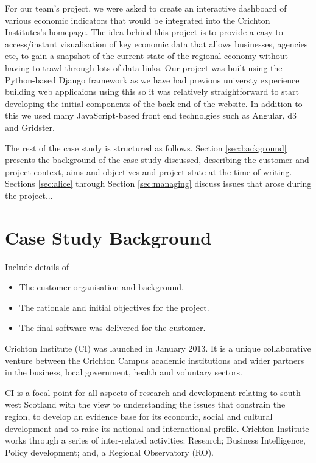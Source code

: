 \documentclass{l3proj}
\begin{document}
For our team's project, we were asked to create an interactive dashboard of various economic indicators that would be
integrated into the Crichton Institutes's homepage. The idea behind this project is to provide a easy to access/instant
visualisation of key economic data that allows businesses, agencies etc, to gain a snapshot of the current state of the
regional economy without having to trawl through lots of data links. Our project was built using the Python-based Django
framework as we have had previous universty experience building web applicaions using this so it was relatively
straightforward to start developing the initial components of the back-end of the website. In addition to this we used
many JavaScript-based front end technolgies such as Angular, d3 and Gridster. 



The rest of the case study is structured as follows.  Section
\ref{sec:background} presents the background of the case study
discussed, describing the customer and project context, aims and
objectives and project state at the time of writing.  Sections
\ref{sec:alice} through Section \ref{sec:managing} discuss issues that
arose during the project...

\section{Case Study Background}

Include details of 

\begin{itemize}
\item The customer organisation and background.
\item The rationale and initial objectives for the project.
\item The final software was delivered for the customer.
\end{itemize}


Crichton Institute (CI) was launched in January 2013. It is a unique collaborative venture between the Crichton Campus academic
institutions and wider partners in the business, local government, health and voluntary sectors.

CI is a focal point for all aspects of research and development relating to south-west Scotland with the view to understanding the
issues that constrain the region, to develop an evidence base for its economic, social and cultural development and to raise its
national and international profile. Crichton Institute works through a series of inter-related activities: Research;
Business Intelligence, Policy development; and, a Regional Observatory (RO).
\end{document}

